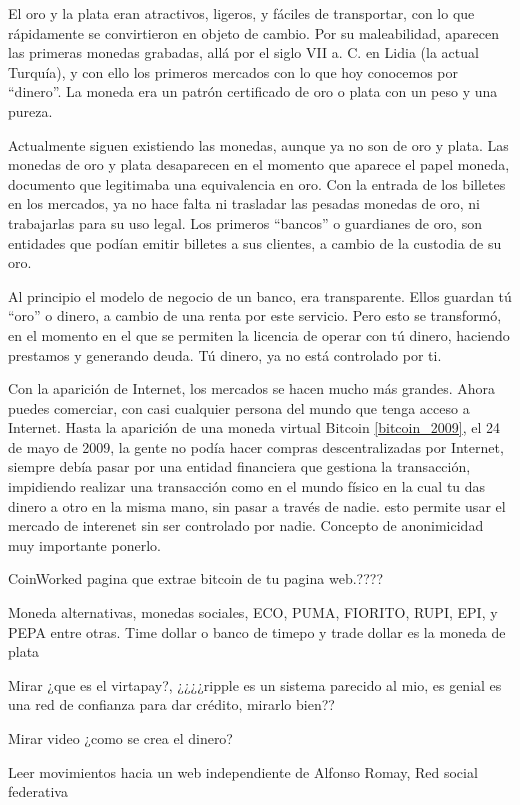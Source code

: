 El oro y la plata eran atractivos, ligeros, y fáciles de transportar, con lo que rápidamente se convirtieron en objeto de cambio. Por su maleabilidad, aparecen las primeras monedas grabadas, allá por el siglo VII a. C. en Lidia (la actual Turquía), y con ello los primeros mercados con lo que hoy conocemos por ``dinero''. La moneda era un patrón certificado de oro o plata con un peso y una pureza. 

Actualmente siguen existiendo las monedas, aunque ya no son de oro y plata. Las monedas de oro y plata desaparecen en el momento que aparece el papel moneda, documento que legitimaba una equivalencia en oro. Con la entrada de los billetes en los mercados, ya no hace falta ni trasladar las pesadas monedas de oro, ni trabajarlas para su uso legal. Los primeros ``bancos'' o guardianes de oro, son entidades que podían emitir billetes a sus clientes, a cambio de la custodia de su oro.

Al principio el modelo de negocio de un banco, era transparente. Ellos guardan tú ``oro'' o dinero, a cambio de una renta por este servicio. Pero esto se transformó, en el momento en el que se permiten la licencia de operar con tú dinero, haciendo prestamos y generando deuda. Tú dinero, ya no está controlado por ti.
 
Con la aparición de Internet, los mercados se hacen mucho más grandes. Ahora puedes comerciar, con casi cualquier persona del mundo que tenga acceso a Internet. Hasta la aparición de una moneda virtual Bitcoin \ref{bitcoin_2009}, el 24 de mayo de 2009, la gente no podía hacer compras descentralizadas por Internet, siempre debía pasar por una entidad financiera que gestiona la transacción, impidiendo realizar una transacción como en el mundo físico en la cual tu das dinero a otro en la misma mano, sin pasar a través de nadie. esto permite usar el mercado de interenet sin ser controlado por nadie. Concepto de anonimicidad muy importante ponerlo.

CoinWorked pagina que extrae bitcoin de tu pagina web.????

Moneda alternativas, monedas sociales, ECO, PUMA, FIORITO, RUPI, EPI, y PEPA entre otras. Time dollar o banco de timepo y trade dollar es la moneda de plata

Mirar ¿que es el virtapay?, ¿¿¿¿ripple es un sistema parecido al mio, es genial es una red de confianza para dar crédito, mirarlo bien??

Mirar video ¿como se crea el dinero?

Leer movimientos hacia un web independiente de Alfonso Romay, Red social federativa

